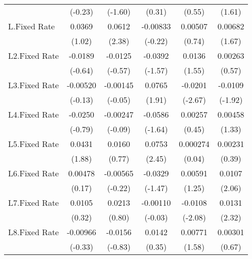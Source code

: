{\begin{longtable}{l*{5}{c}}
                &  (-0.23)         &  (-1.60)         &   (0.31)         &   (0.55)         &   (1.61)         \\
[1em]
L.Fixed Rate    &   0.0369         &   0.0612\sym{*}  & -0.00833         &  0.00507         &  0.00682         \\
                &   (1.02)         &   (2.38)         &  (-0.22)         &   (0.74)         &   (1.67)         \\
[1em]
L2.Fixed Rate   &  -0.0189         &  -0.0125         &  -0.0392         &   0.0136         &  0.00263         \\
                &  (-0.64)         &  (-0.57)         &  (-1.57)         &   (1.55)         &   (0.57)         \\
[1em]
L3.Fixed Rate   & -0.00520         & -0.00145         &   0.0765         &  -0.0201\sym{**} &  -0.0109         \\
                &  (-0.13)         &  (-0.05)         &   (1.91)         &  (-2.67)         &  (-1.92)         \\
[1em]
L4.Fixed Rate   &  -0.0250         & -0.00247         &  -0.0586         &  0.00257         &  0.00458         \\
                &  (-0.79)         &  (-0.09)         &  (-1.64)         &   (0.45)         &   (1.33)         \\
[1em]
L5.Fixed Rate   &   0.0431         &   0.0160         &   0.0753\sym{*}  & 0.000274         &  0.00231         \\
                &   (1.88)         &   (0.77)         &   (2.45)         &   (0.04)         &   (0.39)         \\
[1em]
L6.Fixed Rate   &  0.00478         & -0.00565         &  -0.0329         &  0.00591         &   0.0107\sym{*}  \\
                &   (0.17)         &  (-0.22)         &  (-1.47)         &   (1.25)         &   (2.06)         \\
[1em]
L7.Fixed Rate   &   0.0105         &   0.0213         & -0.00110         &  -0.0108\sym{*}  &   0.0131\sym{*}  \\
                &   (0.32)         &   (0.80)         &  (-0.03)         &  (-2.08)         &   (2.32)         \\
[1em]
L8.Fixed Rate   & -0.00966         &  -0.0156         &   0.0142         &  0.00771         &  0.00301         \\
                &  (-0.33)         &  (-0.83)         &   (0.35)         &   (1.58)         &   (0.67)         \\

\end{longtable}}
